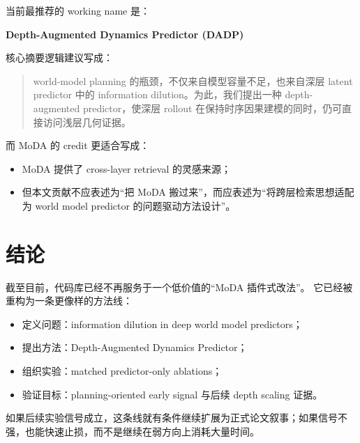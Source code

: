\documentclass[UTF8,a4paper,11pt]{ctexart}
\begin{document}
当前最推荐的 working name 是：

\begin{center}
\textbf{Depth-Augmented Dynamics Predictor (DADP)}
\end{center}

核心摘要逻辑建议写成：

\begin{quote}
world-model planning 的瓶颈，不仅来自模型容量不足，也来自深层 latent predictor 中的 information dilution。为此，我们提出一种 depth-augmented predictor，使深层 rollout 在保持时序因果建模的同时，仍可直接访问浅层几何证据。
\end{quote}

而 MoDA 的 credit 更适合写成：

\begin{itemize}[leftmargin=2em]
  \item MoDA 提供了 cross-layer retrieval 的灵感来源；
  \item 但本文贡献不应表述为“把 MoDA 搬过来”，而应表述为“将跨层检索思想适配为 world model predictor 的问题驱动方法设计”。
\end{itemize}

\section{结论}

截至目前，代码库已经不再服务于一个低价值的“MoDA 插件式改法”。
它已经被重构为一条更像样的方法线：

\begin{itemize}[leftmargin=2em]
  \item 定义问题：information dilution in deep world model predictors；
  \item 提出方法：Depth-Augmented Dynamics Predictor；
  \item 组织实验：matched predictor-only ablations；
  \item 验证目标：planning-oriented early signal 与后续 depth scaling 证据。
\end{itemize}

如果后续实验信号成立，这条线就有条件继续扩展为正式论文叙事；如果信号不强，也能快速止损，而不是继续在弱方向上消耗大量时间。
\end{document}
